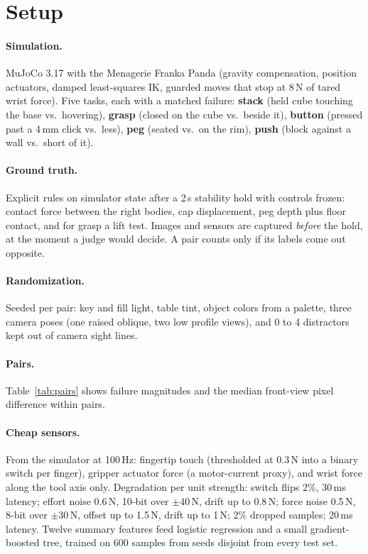 \documentclass[10pt,twocolumn]{article}
\begin{document}
\section{Setup}
\paragraph{Simulation.} MuJoCo 3.17 with the Menagerie Franka Panda (gravity compensation, position actuators, damped least-squares IK, guarded moves that stop at 8\,N of tared wrist force). Five tasks, each with a matched failure: \textbf{stack} (held cube touching the base vs.\ hovering), \textbf{grasp} (closed on the cube vs.\ beside it), \textbf{button} (pressed past a 4\,mm click vs.\ less), \textbf{peg} (seated vs.\ on the rim), \textbf{push} (block against a wall vs.\ short of it).
\paragraph{Ground truth.} Explicit rules on simulator state after a 2\,s stability hold with controls frozen: contact force between the right bodies, cap displacement, peg depth plus floor contact, and for grasp a lift test. Images and sensors are captured \emph{before} the hold, at the moment a judge would decide. A pair counts only if its labels come out opposite.
\paragraph{Randomization.} Seeded per pair: key and fill light, table tint, object colors from a palette, three camera poses (one raised oblique, two low profile views), and 0 to 4 distractors kept out of camera sight lines.
\paragraph{Pairs.} Table~\ref{tab:pairs} shows failure magnitudes and the median front-view pixel difference within pairs.
\begin{table}[t]\centering\small\caption{Scaled set: minimal pairs per task.}\label{tab:pairs}\end{table}
\paragraph{Cheap sensors.} From the simulator at 100\,Hz: fingertip touch (thresholded at 0.3\,N into a binary switch per finger), gripper actuator force (a motor-current proxy), and wrist force along the tool axis only. Degradation per unit strength: switch flips 2\%, 30\,ms latency; effort noise 0.6\,N, 10-bit over $\pm$40\,N, drift up to 0.8\,N; force noise 0.5\,N, 8-bit over $\pm$30\,N, offset up to 1.5\,N, drift up to 1\,N; 2\% dropped samples; 20\,ms latency. Twelve summary features feed logistic regression and a small gradient-boosted tree, trained on 600 samples from seeds disjoint from every test set.
\end{document}
